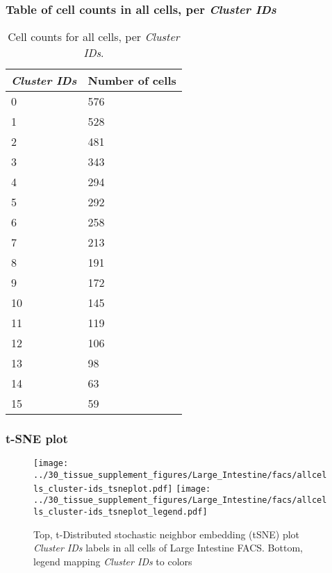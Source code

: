 \subsubsection{Table of cell counts in all cells, per \emph{Cluster IDs}}\begin{table}[h]
\centering
\label{my-label}
\begin{tabular}{@{}ll@{}}
\toprule

\emph{Cluster IDs}& Number of cells \\ \midrule
0 & 576 \\

1 & 528 \\

2 & 481 \\

3 & 343 \\

4 & 294 \\

5 & 292 \\

6 & 258 \\

7 & 213 \\

8 & 191 \\

9 & 172 \\

10 & 145 \\

11 & 119 \\

12 & 106 \\

13 & 98 \\

14 & 63 \\

15 & 59 \\
\bottomrule
\end{tabular}
\caption{Cell counts for all cells, per \emph{Cluster IDs}.}
\end{table}

\clearpage
\subsubsection{t-SNE plot}
\begin{figure}[h]
\centering
\texttt{[image: ../30\_tissue\_supplement\_figures/Large\_Intestine/facs/allcells\_cluster-ids\_tsneplot.pdf]}
\texttt{[image: ../30\_tissue\_supplement\_figures/Large\_Intestine/facs/allcells\_cluster-ids\_tsneplot\_legend.pdf]}
\caption{Top, t-Distributed stochastic neighbor embedding (tSNE) plot  \emph{Cluster IDs} labels in all cells of Large Intestine FACS. Bottom, legend mapping \emph{Cluster IDs} to colors}
\end{figure}


